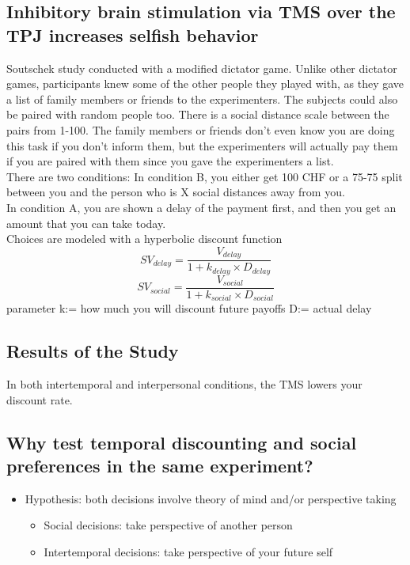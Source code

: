 \subsection{Inhibitory brain stimulation via TMS over the TPJ increases selfish behavior}
Soutschek study conducted with a modified dictator game. Unlike other dictator games, participants knew some of the other people they played with, as they gave a list of family members or friends to the experimenters. The subjects could also be paired with random people too. There is a social distance scale between the pairs from 1-100. The family members or friends don't even know you are doing this task if you don't inform them, but the experimenters will actually pay them if you are paired with them since you gave the experimenters a list.
\\There are two conditions: In condition B, you either get 100 CHF or a 75-75 split between you and the person who is X social distances away from you.
\\In condition A, you are shown a delay of the payment first, and then you get an amount that you can take today.
\\Choices are modeled with a hyperbolic discount function
\[SV_{delay} = \frac{V_{delay}}{1 + k_{delay} \times D_{delay}}\]
\[SV_{social} = \frac{V_{social}}{1 + k_{social} \times D_{social}}\]
parameter k:= how much you will discount future payoffs 
D:= actual delay
\subsection{Results of the Study}
In both intertemporal and interpersonal conditions, the TMS lowers your discount rate.
\subsection{Why test temporal discounting and social preferences in the same experiment?}
\begin{itemize}
    \item Hypothesis: both decisions involve theory of mind and/or perspective taking
    \begin{itemize}
        \item Social decisions: take perspective of another person
        \item Intertemporal decisions: take perspective of your future self
    \end{itemize}
\end{itemize}


